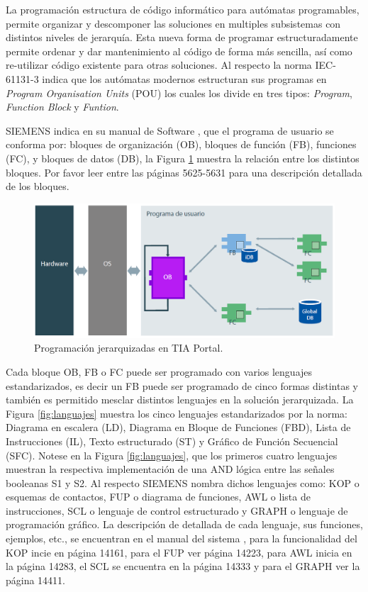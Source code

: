 La programación  estructura de  código informático para autómatas programables, permite organizar y descomponer  las soluciones en multiples subsistemas con distintos niveles de jerarquía. Esta  nueva forma de programar estructuradamente permite ordenar y dar mantenimiento al código de forma más sencilla, así como re-utilizar  código existente para otras soluciones. Al respecto la norma IEC-61131-3 \cite{Tiegelkamp10} indica que los autómatas modernos estructuran sus programas en \textit{Program Organisation Units} (POU) los cuales los divide en tres tipos: \textit{Program}, \textit{Function Block} y \textit{Funtion}.  

SIEMENS indica en su manual de Software \cite{TIA-S7}, que el programa de usuario se conforma por: bloques  de organización (OB), bloques de función (FB), funciones (FC), y bloques de datos (DB), la Figura \ref{fig:plc} muestra la relación entre los distintos bloques. Por favor leer entre las páginas 5625-5631 para una descripción detallada de los bloques.

\begin{figure}[H]
	\centering
	\includegraphics[width=0.85\linewidth]{fig/PLC.png}
	\caption{Programación jerarquizadas en TIA Portal.}
	\label{fig:plc}
\end{figure}


Cada bloque OB, FB o FC puede ser programado con varios lenguajes estandarizados, es decir un FB puede ser programado de cinco formas distintas y también es permitido mesclar distintos lenguajes en la solución jerarquizada. La Figura \ref{fig:languajes} muestra los cinco lenguajes estandarizados por la norma: Diagrama en escalera (LD), Diagrama en Bloque de Funciones (FBD), Lista de Instrucciones (IL), Texto estructurado (ST) y Gráfico de Función Secuencial (SFC). Notese en la Figura \ref{fig:languajes}, que los primeros cuatro lenguajes muestran la respectiva implementación de una AND lógica entre las señales booleanas  S1  y S2. Al respecto SIEMENS nombra dichos lenguajes como: KOP o esquemas de contactos, FUP o diagrama de funciones, AWL o lista de instrucciones, SCL o lenguaje de control estructurado y GRAPH o lenguaje de programación gráfico. La descripción de detallada de cada lenguaje, sus funciones, ejemplos, etc., se encuentran en el manual del sistema \cite{TIA-S7}, para la funcionalidad del KOP incie en página 14161, para el FUP ver página 14223, para  AWL inicia en la página 14283, el SCL se encuentra en la página 14333 y para el GRAPH ver la página 14411.

